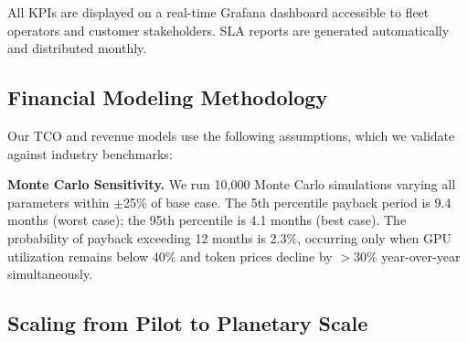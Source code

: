 \documentclass[conference,10pt,letterpaper]{IEEEtran}
\begin{document}
All KPIs are displayed on a real-time Grafana dashboard accessible to fleet operators and customer stakeholders. SLA reports are generated automatically and distributed monthly.

\subsection{Financial Modeling Methodology}

Our TCO and revenue models use the following assumptions, which we validate against industry benchmarks:

\begin{table}[!t]
\caption{Financial Model Assumptions}
\label{tab:assumptions}
\centering\scriptsize
{}
\end{table}

\textbf{Monte Carlo Sensitivity.} We run 10,000 Monte Carlo simulations varying all parameters within $\pm$25\% of base case. The 5th percentile payback period is 9.4 months (worst case); the 95th percentile is 4.1 months (best case). The probability of payback exceeding 12 months is 2.3\%, occurring only when GPU utilization remains below 40\% and token prices decline by $>$30\% year-over-year simultaneously.

\subsection{Scaling from Pilot to Planetary Scale}
\end{document}

